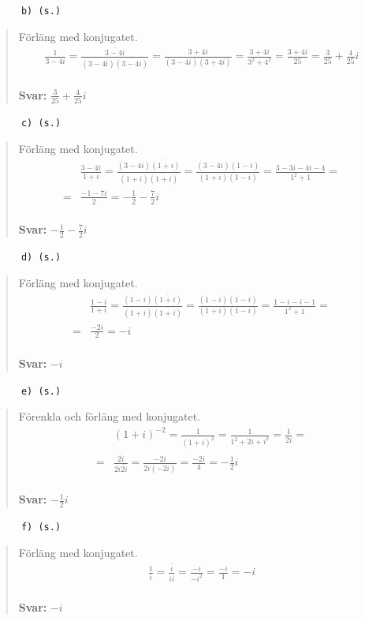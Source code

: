 \documentclass[a4paper]{article}
\newcommand{\tskcol}[1]{\textcolor{tskcol}{#1}}
\begin{document}
	\texttt{\tskcol{~~~~~~b) (s.)}}
	\begin{quotation}
		\noindent
		Förläng med konjugatet.
		\begin{align*}
		\frac{1}{3-4i}=
		\frac{\overline{3-4i}}{(3-4i)\overline{(3-4i)}}=
		\frac{3+4i}{(3-4i)(3+4i)}=
		\frac{3+4i}{3^2+4^2}=
		\frac{3+4i}{25}=
		\frac{3}{25}+\frac{4}{25}i
		\end{align*}
		\\
		\textbf{Svar:} $\frac{3}{25}+\frac{4}{25}i$
	\end{quotation}
	
	\texttt{\tskcol{~~~~~~c) (s.)}}
	\begin{quotation}
		\noindent
		Förläng med konjugatet.
		\begin{align*}
		&\frac{3-4i}{1+i}=
		\frac{(3-4i)\overline{(1+i)}}{(1+i)\overline{(1+i)}}=
		\frac{(3-4i)(1-i)}{(1+i)(1-i)}=
		\frac{3-3i-4i-4}{1^2+1}= \\ =
		&\frac{-1-7i}{2}=
		-\frac{1}{2}-\frac{7}{2}i
		\end{align*}
		\\
		\textbf{Svar:} $-\frac{1}{2}-\frac{7}{2}i$
	\end{quotation}
	
	\texttt{\tskcol{~~~~~~d) (s.)}}
	\begin{quotation}
		\noindent
		Förläng med konjugatet.
		\begin{align*}
		&\frac{1-i}{1+i}=
		\frac{(1-i)\overline{(1+i)}}{(1+i)\overline{(1+i)}}=
		\frac{(1-i)(1-i)}{(1+i)(1-i)}=
		\frac{1-i-i-1}{1^2+1}= \\ =
		&\frac{-2i}{2}=
		-i
		\end{align*}
		\\
		\textbf{Svar:} $-i$
	\end{quotation}
	
	\texttt{\tskcol{~~~~~~e) (s.)}}
	\begin{quotation}
		\noindent
		Förenkla och förläng med konjugatet.
		\begin{align*}
		&(1+i)^{-2}=
		\frac{1}{(1+i)^2}=
		\frac{1}{1^2+2i+i^2}=
		\frac{1}{2i}= \\ =
		&\frac{\overline{2i}}{2i\overline{2i}}=
		\frac{-2i}{2i(-2i)}=
		\frac{-2i}{4}=
		-\frac{1}{2}i
		\end{align*}
		\\
		\textbf{Svar:} $-\frac{1}{2}i$
	\end{quotation}
	
	\texttt{\tskcol{~~~~~~f) (s.)}}
	\begin{quotation}
		\noindent
		Förläng med konjugatet.
		\begin{align*}
		\frac{1}{i}=
		\frac{\overline{i}}{i\overline{i}}=
		\frac{-i}{-i^2}=
		\frac{-i}{1}=
		-i
		\end{align*}
		\\
		\textbf{Svar:} $-i$
	\end{quotation}
	
\end{document}
